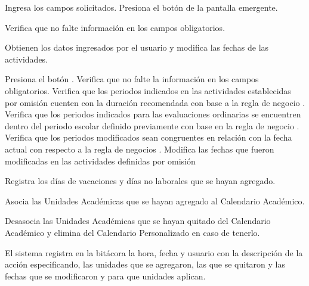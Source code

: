 \begin{UCtrayectoria}
     \UCpaso [\UCactor] \label{IN-DAE-CU2.2:pop} Ingresa los campos solicitados.
    \UCpaso [\UCactor] Presiona el botón  de la pantalla emergente.
    
    \UCpaso Verifica que no falte información en los campos obligatorios. 
    
    \UCpaso Obtienen los datos ingresados por el usuario y modifica las fechas de las actividades.
    
    
    \UCpaso[\UCactor]Presiona el botón .     
    \UCpaso Verifica que no falte la información en los campos obligatorios. 
    \UCpaso Verifica que los periodos indicados en las actividades establecidas por omisión cuenten con la duración recomendada con base a la regla de negocio . 
    \UCpaso Verifica que los periodos indicados para las evaluaciones ordinarias se encuentren dentro del periodo escolar definido previamente con base en la regla de negocio . 
	\UCpaso Verifica que los periodos modificados sean congruentes en relación con la fecha actual con respecto a la regla de negocios . 
    \UCpaso Modifica las fechas que fueron modificadas en las actividades definidas por omisión
    
    \UCpaso Registra los días de vacaciones y días no laborales que se hayan agregado.
    
    \UCpaso Asocia las Unidades Académicas que se hayan agregado al Calendario Académico.
    
    \UCpaso Desasocia las Unidades Académicas que se hayan quitado del Calendario Académico y elimina del Calendario Personalizado en caso de tenerlo.
    
    \UCpaso El sistema registra en la bitácora la hora, fecha y usuario con la descripción de la acción especificando, las unidades que se agregaron, las que se quitaron y las fechas que se modificaron y para que unidades aplican.
    

\end{UCtrayectoria}
